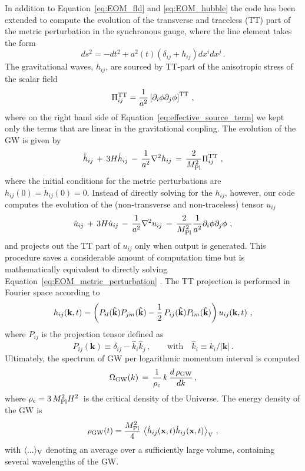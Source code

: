 \documentclass[12pt]{article}
\newcommand{\be}{\begin{equation}}
\newcommand{\ee}{\end{equation}}
\begin{document}
In addition to Equation~\eqref{eq:EOM_fld} and \eqref{eq:EOM_hubble} the code has been extended to compute the evolution of the transverse and traceless (TT) part of the metric perturbation in the synchronous gauge, where the line element takes the form
\be
ds^2 = -dt^2 + a^2(t)(\delta_{ij} + h_{ij})dx^idx^j\,.
\ee
The gravitational waves, $h_{ij}$, are sourced by TT-part of the anisotropic stress of the scalar field
\begin{equation}
\Pi_{ij}^{\rm TT} =\frac{1}{a^2}\left[\partial_i\phi\partial_j\phi\right]^{\rm TT}\,,
\label{eq:effective_source_term}
\end{equation}
where on the right hand side of Equation~\eqref{eq:effective_source_term} we kept only the terms that are linear in the gravitational coupling. The evolution of the GW is given by
\begin{equation}
\ddot{h}_{ij}\, + \,3H\dot{h}_{ij}\, - \,\frac{1}{a^2}\nabla^2h_{ij}\, = \,\frac{2}{M^2_{\rm Pl}}\Pi_{ij}^{\rm TT}~,
\label{eq:EOM_metric_perturbation}
\end{equation} 
where the initial conditions for the metric perturbations are $h_{ij}(0)=\dot{h}_{ij}(0)=0.$
Instead of directly solving for the $h_{ij}$, however, our code computes the evolution of the (non-transverse and non-traceless) tensor $u_{ij}$ 
\be
\ddot{u}_{ij}\, + \,3H\dot{u}_{ij}\, - \,\frac{1}{a^2}\nabla^2u_{ij}\, = \,\frac{2}{M^2_{\rm Pl}}\frac{1}{a^2}\partial_i\phi\partial_j\phi~,
\label{eq:EOM_metric_perturbation_NON-TT}
\ee
and projects out the TT part of $u_{ij}$ only when output is generated. This procedure saves a considerable amount of computation time but is mathematically equivalent to directly solving Equation~\eqref{eq:EOM_metric_perturbation} \cite{GarciaBellido:2007af}. The TT projection is performed in Fourier space according to
\be
h_{ij}(\textbf{k},t) = \left(P_{il}(\textbf{\textbf{\^{k}}})P_{jm}(\textbf{\textbf{\^{k}}}) - \frac{1}{2}\,P_{ij}
(\textbf{\textbf{\^{k}}})P_{lm}(\textbf{\^{k}})\right)u_{ij}(\textbf{k},t)~,
\ee
where $P_{ij}$ is the projection tensor defined as
\be
P_{ij}(\textbf{\^{k}}) \equiv \delta_{ij} - \hat{k}_i\hat{k}_j\,,\qquad\textrm{with}\quad\hat{k}_i \equiv k_i/|\textbf{k}|\,.
\ee
Ultimately, the spectrum of GW per logarithmic momentum interval is computed
\be
\Omega_{\rm GW}(k) \, = \,\frac{1}{\rho_{\rm c}}\,k\,\frac{d\,\rho_{\rm GW}}{dk}\,,
\ee
where $\rho_{\rm c} = 3\,M^2_{\rm Pl}H^2\,$ is the critical density of the Universe. The energy density of the GW is 
\be 
\rho_{\rm GW}(t) = \frac{M^2_{\rm Pl}}{4}\,\left\langle\dot{h}_{ij}(\textbf{x},t)\dot{h}_{ij}(\textbf{x},t)\right\rangle_{\rm{V}}\,,
\ee
with $\langle...\rangle_{\rm V}$ denoting an average over a sufficiently large volume, containing several wavelengths of the GW.
\end{document}

